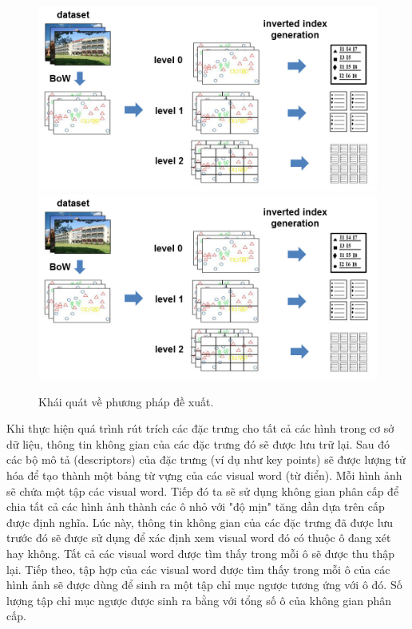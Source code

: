\begin{figure}[!htbp]
  \begin{center}
    \leavevmode
    \ifpdf
      \includegraphics[scale=0.15]{basicIdea}
    \else
      \includegraphics[scale=0.15]{basicIdea}
    \fi
    \caption[Khái quát về phương pháp đề xuất]{Khái quát về phương pháp đề xuất.}
    \label{FigBasicIdea}
  \end{center}
\end{figure}

Khi thực hiện quá trình rút trích các đặc trưng cho tất cả các hình trong cơ sở dữ liệu, thông tin không gian của các đặc trưng đó sẽ được lưu trữ lại. Sau đó các bộ mô tả (descriptors) của đặc trưng (ví dụ như key points) sẽ được lượng tử hóa để tạo thành một bảng từ vựng của các visual word (từ điển). Mỗi hình ảnh sẽ chứa một tập các visual word. Tiếp đó ta sẽ sử dụng không gian phân cấp để chia tất cả các hình ảnh thành các ô nhỏ với "độ mịn" tăng dần dựa trên cấp được định nghĩa. Lúc này, thông tin không gian của các đặc trưng đã được lưu trước đó sẽ được sử dụng để xác định xem visual word đó có thuộc ô đang xét hay không. Tất cả các visual word được tìm thấy trong mỗi ô sẽ được thu thập lại. Tiếp theo, tập hợp của các visual word được tìm thấy trong mỗi ô của các hình ảnh sẽ được dùng để sinh ra một tập chỉ mục ngược tương ứng với ô đó. Số lượng tập chỉ mục ngược được sinh ra bằng với tổng số ô của không gian phân cấp.

